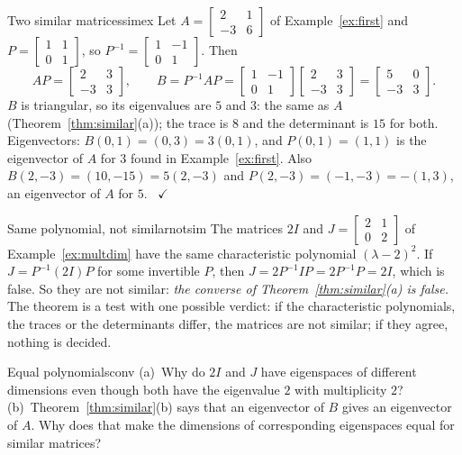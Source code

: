 \documentclass[11pt]{article}
\begin{document}
\begin{exmp}{Two similar matrices}{simex}
Let $A=\begin{bmatrix}2&1\\-3&6\end{bmatrix}$ of Example~\ref{ex:first} and $P=\begin{bmatrix}1&1\\0&1\end{bmatrix}$, so $P^{-1}=\begin{bmatrix}1&-1\\0&1\end{bmatrix}$. Then
\[
AP=\begin{bmatrix}2&3\\-3&3\end{bmatrix},\qquad B=P^{-1}AP=\begin{bmatrix}1&-1\\0&1\end{bmatrix}\begin{bmatrix}2&3\\-3&3\end{bmatrix}=\begin{bmatrix}5&0\\-3&3\end{bmatrix}.
\]
$B$ is triangular, so its eigenvalues are $5$ and $3$: the same as $A$ (Theorem~\ref{thm:similar}(a)); the trace is $8$ and the determinant is $15$ for both. Eigenvectors: $B(0,1)=(0,3)=3(0,1)$, and $P(0,1)=(1,1)$ is the eigenvector of $A$ for $3$ found in Example~\ref{ex:first}. Also $B(2,-3)=(10,-15)=5(2,-3)$ and $P(2,-3)=(-1,-3)=-(1,3)$, an eigenvector of $A$ for $5$. \ $\checkmark$
\end{exmp}

\begin{exmp}{Same polynomial, not similar}{notsim}
The matrices $2I$ and $J=\begin{bmatrix}2&1\\0&2\end{bmatrix}$ of Example~\ref{ex:multdim} have the same characteristic polynomial $(\lambda-2)^2$. If $J=P^{-1}(2I)P$ for some invertible $P$, then $J=2P^{-1}IP=2P^{-1}P=2I$, which is false. So they are not similar: \emph{the converse of Theorem~\ref{thm:similar}(a) is false.} The theorem is a test with one possible verdict: if the characteristic polynomials, the traces or the determinants differ, the matrices are not similar; if they agree, nothing is decided.
\end{exmp}

\begin{think}{Equal polynomials}{conv}
(a)~Why do $2I$ and $J$ have eigenspaces of different dimensions even though both have the eigenvalue $2$ with multiplicity $2$? (b)~Theorem~\ref{thm:similar}(b) says that an eigenvector of $B$ gives an eigenvector of $A$. Why does that make the dimensions of corresponding eigenspaces equal for similar matrices?
\end{think}
\end{document}
